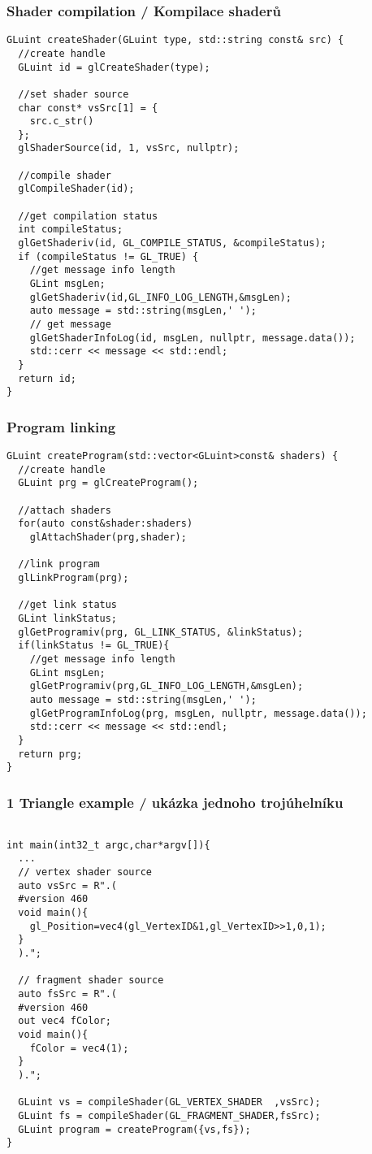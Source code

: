 \begin{frame}[fragile]\frametitle{Shader compilation / Kompilace shaderů}\scriptsize
\begin{verbatim}
GLuint createShader(GLuint type, std::string const& src) {
  //create handle
  GLuint id = glCreateShader(type);

  //set shader source
  char const* vsSrc[1] = {
    src.c_str()
  };
  glShaderSource(id, 1, vsSrc, nullptr); 

  //compile shader
  glCompileShader(id);

  //get compilation status
  int compileStatus;
  glGetShaderiv(id, GL_COMPILE_STATUS, &compileStatus);
  if (compileStatus != GL_TRUE) {
    //get message info length
    GLint msgLen;
    glGetShaderiv(id,GL_INFO_LOG_LENGTH,&msgLen);
    auto message = std::string(msgLen,' ');
    // get message
    glGetShaderInfoLog(id, msgLen, nullptr, message.data());
    std::cerr << message << std::endl;
  }
  return id;
}
\end{verbatim}
\end{frame}

\begin{frame}[fragile]\frametitle{Program linking}\scriptsize
\begin{verbatim}
GLuint createProgram(std::vector<GLuint>const& shaders) {
  //create handle
  GLuint prg = glCreateProgram();

  //attach shaders
  for(auto const&shader:shaders)
    glAttachShader(prg,shader);

  //link program
  glLinkProgram(prg);

  //get link status
  GLint linkStatus;
  glGetProgramiv(prg, GL_LINK_STATUS, &linkStatus);
  if(linkStatus != GL_TRUE){
    //get message info length
    GLint msgLen;
    glGetProgramiv(prg,GL_INFO_LOG_LENGTH,&msgLen);
    auto message = std::string(msgLen,' ');
    glGetProgramInfoLog(prg, msgLen, nullptr, message.data());
    std::cerr << message << std::endl;
  }
  return prg;
}
\end{verbatim}
\end{frame}

\begin{frame}[fragile]\frametitle{1 Triangle example / ukázka jednoho trojúhelníku}\scriptsize
\begin{verbatim}

int main(int32_t argc,char*argv[]){
  ...
  // vertex shader source
  auto vsSrc = R".(
  #version 460
  void main(){
    gl_Position=vec4(gl_VertexID&1,gl_VertexID>>1,0,1);
  }
  ).";

  // fragment shader source
  auto fsSrc = R".(
  #version 460
  out vec4 fColor;
  void main(){
    fColor = vec4(1);
  }
  ).";

  GLuint vs = compileShader(GL_VERTEX_SHADER  ,vsSrc);
  GLuint fs = compileShader(GL_FRAGMENT_SHADER,fsSrc);
  GLuint program = createProgram({vs,fs});
}
\end{verbatim}
\end{frame}


